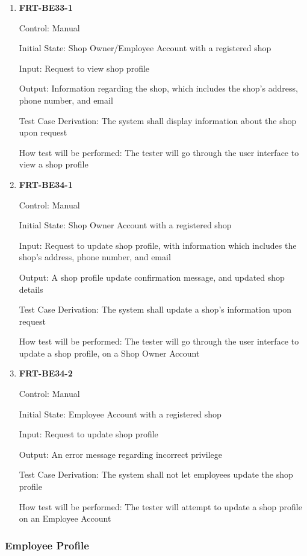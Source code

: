 \documentclass[12pt, titlepage]{article}
\begin{document}
\begin{enumerate}
	\item \textbf{FRT-BE33-1}

	      Control: Manual

	      Initial State: Shop Owner/Employee Account with a registered shop

	      Input: Request to view shop profile

	      Output: Information regarding the shop, which includes the shop's address, phone number, and email

	      Test Case Derivation: The system shall display information about the shop upon request

	      How test will be performed: The tester will go through the user interface to view a shop profile

	\item \textbf{FRT-BE34-1}

	      Control: Manual

	      Initial State: Shop Owner Account with a registered shop

	      Input: Request to update shop profile, with information which includes the shop's address, phone
	      number, and email

	      Output: A shop profile update confirmation message, and updated shop details

	      Test Case Derivation: The system shall update a shop's information upon request

	      How test will be performed: The tester will go through the user interface to update a shop profile,
	      on a Shop Owner Account

	\item \textbf{FRT-BE34-2}

	      Control: Manual

	      Initial State: Employee Account with a registered shop

	      Input: Request to update shop profile

	      Output: An error message regarding incorrect privilege

	      Test Case Derivation: The system shall not let employees update the shop profile

	      How test will be performed: The tester will attempt to update a shop profile on an Employee Account
\end{enumerate}

\subsubsection{Employee Profile}
\end{document}
